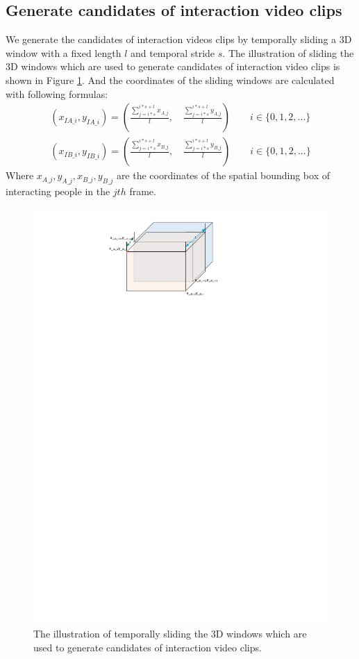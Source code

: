\subsection{Generate candidates of interaction video clips}
We generate the candidates of interaction videos clips by temporally sliding a 3D window with a fixed length \(l\) and temporal stride \(s\).  The illustration of sliding the 3D windows which are used to generate candidates of interaction video clips is shown in Figure \ref{fig:sliding_window}. And the coordinates of the sliding windows are calculated with following formulas:
\begin{eqnarray}
	(x_{IA\_i},y_{IA\_i}) = (\frac{\sum_{j=i*s}^{i*s+l} x_{A\_j}}{l}, \quad \frac{\sum_{j=i*s}^{i*s+l} y_{A\_j}}{l})   \quad \quad i \in \{0,1,2,...\} \\
	(x_{IB\_i},y_{IB\_i}) = (\frac{\sum_{j=i*s}^{i*s+l} x_{B\_j}}{l}, \quad \frac{\sum_{j=i*s}^{i*s+l} y_{B\_j}}{l})   \quad \quad i \in \{0,1,2,...\}	
\end{eqnarray}
Where \(x_{A\_j}, y_{A\_j}, x_{B\_j}, y_{B\_j}\) are the coordinates of the spatial bounding box of interacting people in the \(jth\) frame. 
\begin{figure}
	\includegraphics[trim=2cm 23.5cm 0cm 1cm]{fig01/sliding_window.pdf}
	\caption{The illustration of temporally sliding the 3D windows which are used to generate candidates of interaction video clips.}
	\label{fig:sliding_window}
\end{figure}

